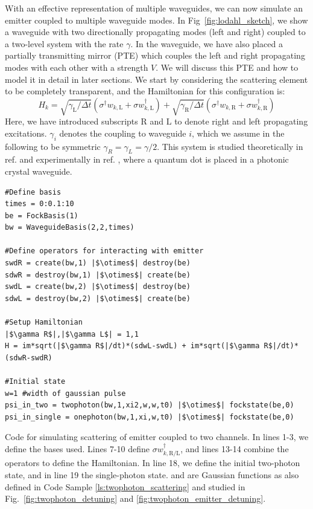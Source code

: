 With an effective representation of multiple waveguides, we can now simulate an emitter coupled to multiple waveguide modes. In Fig~\ref{fig:lodahl_sketch}, we show a waveguide with two directionally propagating modes (left and right) coupled to a two-level system with the rate $\gamma$. In the waveguide, we have also placed a partially transmitting mirror (PTE) which couples the left and right propagating modes with each other with a strength $V$. We will discuss this PTE and how to model it in detail in later sections. We start by considering the scattering element to be completely transparent, and the Hamiltonian for this configuration is:
\begin{equation}
    H_k = \sqrt{\gamma_\mathrm{L}/\Delta t} ( \sigma^\dagger w_{k,\mathrm{L}} + \sigma w^\dagger_{k,\mathrm{L}} ) + \sqrt{\gamma_\mathrm{R}/\Delta t} ( \sigma^\dagger w_{k,\mathrm{R}} + \sigma w^\dagger_{k,\mathrm{R}})  \label{eq:lodahl_ham}
\end{equation}
Here, we have introduced subscripts $\mathrm{R}$ and $\mathrm{L}$ to denote right and left propagating excitations. $\gamma_i$ denotes the coupling to waveguide $i$, which we assume in the following to be symmetric $\gamma_R = \gamma_L = \gamma/2$. This system is studied theoretically in ref. \cite{Joanesarson2020Few-photonGeometries} and experimentally in ref. \cite{LeJeannic2022DynamicalEmitter}, where a quantum dot is placed in a photonic crystal waveguide.
\begin{listing}[H]
\begin{verbatim}
#Define basis
times = 0:0.1:10
be = FockBasis(1)
bw = WaveguideBasis(2,2,times)

#Define operators for interacting with emitter
swdR = create(bw,1) |$\otimes$| destroy(be)
sdwR = destroy(bw,1) |$\otimes$| create(be)
swdL = create(bw,2) |$\otimes$| destroy(be)
sdwL = destroy(bw,2) |$\otimes$| create(be)

#Setup Hamiltonian
|$\gamma R$|,|$\gamma L$| = 1,1
H = im*sqrt(|$\gamma R$|/dt)*(sdwL-swdL) + im*sqrt(|$\gamma R$|/dt)*(sdwR-swdR)

#Initial state
w=1 #width of gaussian pulse
psi_in_two = twophoton(bw,1,xi2,w,w,t0) |$\otimes$| fockstate(be,0)
psi_in_single = onephoton(bw,1,xi,w,t0) |$\otimes$| fockstate(be,0)
\end{verbatim}
\caption{Code for simulating scattering of emitter coupled to two channels. In lines 1-3, we define the bases used. Lines 7-10 define $\sigma w^\dagger_{k,\mathrm{R}/\mathrm{L}}$, and lines 13-14 combine the operators to define the Hamiltonian. In line 18, we define the initial two-photon state, and in line 19 the single-photon state.  and  are Gaussian functions as also defined in Code Sample \ref{ls:twophoton_scattering} and studied in Fig.~\ref{fig:twophoton_detuning} and \ref{fig:twophoton_emitter_detuning}. }
\label{ls:lodahlcode}
\end{listing}

